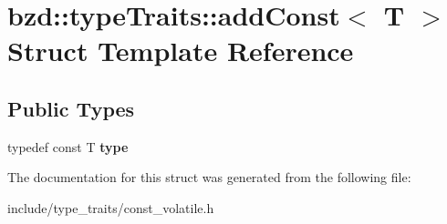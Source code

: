 \hypertarget{structbzd_1_1typeTraits_1_1addConst}{}\section{bzd\+:\+:type\+Traits\+:\+:add\+Const$<$ T $>$ Struct Template Reference}
\label{structbzd_1_1typeTraits_1_1addConst}
\subsection*{Public Types}
\begin{DoxyCompactItemize}
\item 
\mbox{\label{structbzd_1_1typeTraits_1_1addConst_a81dc1f2e1980c9c6b3af99d856934b92}} 
typedef const T {\bfseries type}
\end{DoxyCompactItemize}


The documentation for this struct was generated from the following file\+:\begin{DoxyCompactItemize}
\item 
include/type\+\_\+traits/const\+\_\+volatile.\+h\end{DoxyCompactItemize}
